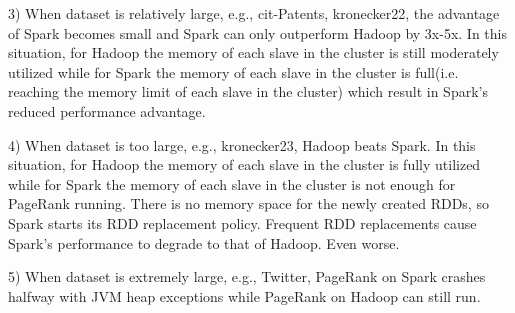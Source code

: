 \documentclass[12pt,conference,letterpaper]{IEEEtran}
\begin{document}
3) When dataset is relatively large, e.g., cit-Patents, kronecker22, the advantage of Spark becomes small and Spark can only outperform Hadoop by 3x-5x. In this situation, for Hadoop the memory of each slave in the cluster is still moderately utilized while for Spark the memory of each slave in the cluster is full(i.e. reaching the memory limit of each slave in the cluster) which result in Spark's reduced performance advantage.

4) When dataset is too large, e.g., kronecker23, Hadoop beats Spark. In this situation, for Hadoop the memory of each slave in the cluster is fully utilized while for Spark the memory of each slave in the cluster is not enough for PageRank running. There is no memory space for the newly created RDDs, so Spark starts its RDD replacement policy. Frequent RDD replacements cause Spark's performance to degrade to that of Hadoop. Even worse.  

5) When dataset is extremely large, e.g., Twitter, PageRank on Spark crashes halfway with JVM heap exceptions while PageRank on Hadoop can still run.



\end{document}

